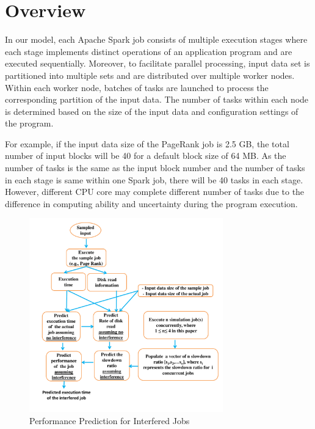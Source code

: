 \section{Overview}
\label{overview}

\noindent
In our model, each Apache Spark job consists of multiple execution stages where each stage implements distinct operations of an application program and are executed sequentially. Moreover, to facilitate parallel processing, input data set is partitioned into multiple sets and are distributed over multiple worker nodes. Within each worker node, batches of tasks are launched to process the corresponding partition of the input data. The number of tasks within each node is determined based on the size of the input data and configuration settings of the program. 


\noindent
For example, if the input data size of the PageRank job is 2.5 GB, the total number of input blocks will be 40 for a default block size of 64 MB. As the number of tasks is the same as the input block number and the number of tasks in each stage is same within one Spark job, there will be 40 tasks in each stage. However, different CPU core may complete different number of tasks due to the difference in computing ability and uncertainty during the program execution. 
\begin{figure}[!t]
\centering
\includegraphics[width=3.3in]{figures/flow1.pdf}
\caption{Performance Prediction for Interfered Jobs}
\label{flow}
\end{figure}

